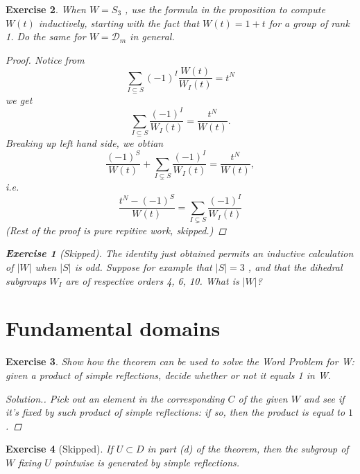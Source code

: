 \documentclass{article}
\theoremstyle{breakstyle}
\newtheorem{exercise}{Exercise}[section]
\newenvironment{solution}
  {\begin{proof}[Solution.]\renewcommand{\qedsymbol}{}}
  {\end{proof}}
\begin{document}
\begin{exercise}
When $W = S_{3}$ , use the formula in the proposition to compute $W(t)$
inductively, starting with the fact that $W(t) = 1 + t$ for a group of rank 1.
Do the same for $W = \mathcal{D}_m$ in general.

\begin{proof}
    Notice from
    $$
    \sum_{I\subseteq S} \left( -1 \right) ^{I}\frac{W(t)}{W_{I}(t)}=t^{N}
    $$
    we get
    $$
    \sum_{I\subseteq S} \frac{(-1)^{I}}{W_{I}(t)}=\frac{t^{N}}{W(t)}
    .$$
    Breaking up left hand side, we obtian
    $$
    \frac{(-1)^{S}}{W(t)}+\sum_{I\subsetneq S}
    \frac{(-1)^{I}}{W_{I}(t)}=\frac{t^{N}}{W(t)}
    ,$$
    i.e.
    $$
    \frac{t^{N}-(-1)^{S}}{W(t)}=\sum_{I\subsetneq S} \frac{(-1)^{I}}{W_{I}(t)}
    $$
    \emph{(Rest of the proof is pure repitive work, skipped.)}
\end{proof}

\begin{exercise}[Skipped]
The identity just obtained permits an inductive calculation of $|W|$ when $|S|$
is odd. Suppose for example that $|S| = 3$ , and that the dihedral subgroups
$W_{I}$ are of respective orders 4, 6, 10. What is $|W|$?
\end{exercise}

\end{exercise}

\section{Fundamental domains}

\begin{exercise}
Show how the theorem can be used to solve the Word Problem for W: given a
product of simple reflections, decide whether or not it equals 1 in W.

\begin{solution}
    Pick out an element in the corresponding $C$ of the given $W$ and see if
    it's fixed by such product of simple reflections: if so, then the product is
    equal to $1$.
\end{solution}

\end{exercise}

\begin{exercise}[Skipped]
If $U \subset D$ in part (d) of the theorem, then the subgroup of $W$ fixing $U$
pointwise is generated by simple reflections.
\end{exercise}
\end{document}
